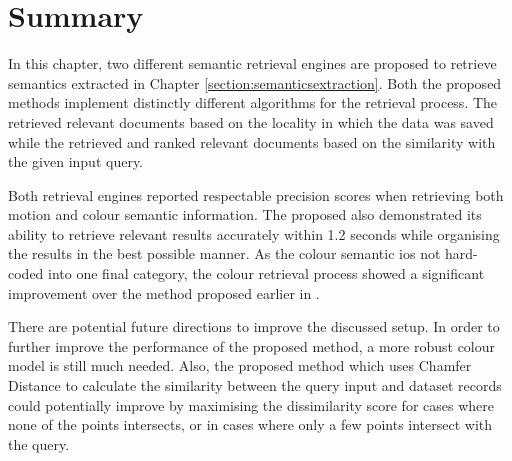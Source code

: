 \section{Summary}

In this chapter, two different semantic retrieval engines are proposed to retrieve semantics extracted in Chapter \ref{section:semanticsextraction}. Both the proposed methods implement distinctly different algorithms for the retrieval process. The \versionOneRet retrieved relevant documents based on the locality in which the data was saved while the \versionTwoRet retrieved and ranked relevant documents based on the similarity with the given input query.

Both retrieval engines reported respectable precision scores when retrieving both motion and colour semantic information. The proposed \versionTwoRet also demonstrated its ability to retrieve relevant results accurately within 1.2 seconds while organising the results in the best possible manner. As the colour semantic ios not hard-coded into one final category, the colour retrieval process showed a significant improvement over the method proposed earlier in \versionOneRet.

There are potential future directions to improve the discussed setup. In order to further improve the performance of the proposed method, a more robust colour model is still much needed. Also, the proposed method which
uses Chamfer Distance to calculate the similarity between the query input and dataset records could potentially improve by maximising the dissimilarity score for cases where none of the points intersects, or in cases where only a few points intersect with the query.

